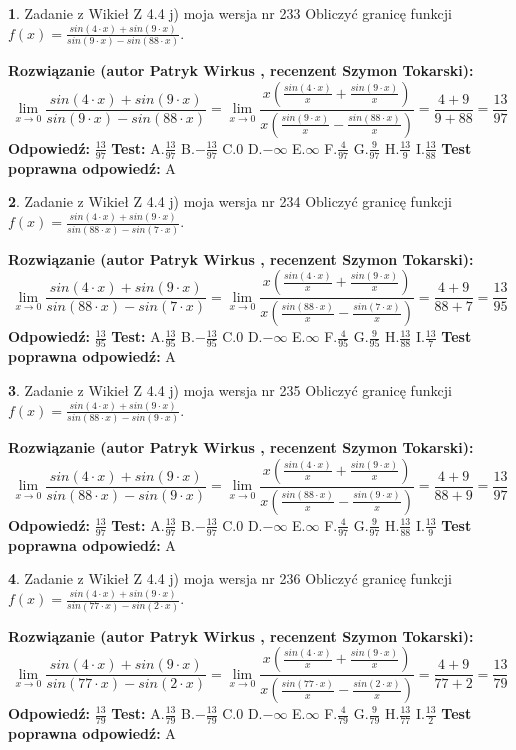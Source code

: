 \documentclass[12pt, a4paper]{article}
\theoremstyle{definition} %
\newtheorem{zad}{}
\newcommand{\zadStart}[1]{\begin{zad}#1\newline}
\newcommand{\zadStop}{\end{zad}}
\newcommand{\rozwStart}[2]{\noindent \textbf{Rozwiązanie (autor #1 , recenzent #2): }\newline}
\newcommand{\rozwStop}{\newline}
\newcommand{\odpStart}{\noindent \textbf{Odpowiedź:}\newline}
\newcommand{\odpStop}{\newline}
\newcommand{\testStart}{\noindent \textbf{Test:}\newline}
\newcommand{\testStop}{\newline}
\newcommand{\kluczStart}{\noindent \textbf{Test poprawna odpowiedź:}\newline}
\newcommand{\kluczStop}{\newline}
\begin{document}
\zadStart{Zadanie z Wikieł Z 4.4 j) moja wersja nr 233}
Obliczyć granicę funkcji $f(x)=\frac{sin(4\cdot x) +sin(9\cdot x)}{sin(9\cdot x) -sin(88\cdot x)}$.
\zadStop
\rozwStart{Patryk Wirkus}{Szymon Tokarski}
$$\lim\limits_{x\to 0}\frac{sin(4\cdot x) +sin(9\cdot x)}{sin(9\cdot x) -sin(88\cdot x)}=\lim\limits_{x\to 0}\frac{x(\frac{sin(4\cdot x)}{x}+\frac{sin(9\cdot x)}{x})}{x(\frac{sin(9\cdot x)}{x}-\frac{sin(88\cdot x)}{x})}=\frac{4+9}{9+88} = \frac{13}{97}$$
\rozwStop
\odpStart
$\frac{13}{97}$
\odpStop
\testStart
A.$\frac{13}{97}$
B.$-\frac{13}{97}$
C.$0$
D.$-\infty$
E.$\infty$
F.$\frac{4}{97}$
G.$\frac{9}{97}$
H.$\frac{13}{9}$
I.$\frac{13}{88}$
\testStop
\kluczStart
A
\kluczStop



\zadStart{Zadanie z Wikieł Z 4.4 j) moja wersja nr 234}
Obliczyć granicę funkcji $f(x)=\frac{sin(4\cdot x) +sin(9\cdot x)}{sin(88\cdot x) -sin(7\cdot x)}$.
\zadStop
\rozwStart{Patryk Wirkus}{Szymon Tokarski}
$$\lim\limits_{x\to 0}\frac{sin(4\cdot x) +sin(9\cdot x)}{sin(88\cdot x) -sin(7\cdot x)}=\lim\limits_{x\to 0}\frac{x(\frac{sin(4\cdot x)}{x}+\frac{sin(9\cdot x)}{x})}{x(\frac{sin(88\cdot x)}{x}-\frac{sin(7\cdot x)}{x})}=\frac{4+9}{88+7} = \frac{13}{95}$$
\rozwStop
\odpStart
$\frac{13}{95}$
\odpStop
\testStart
A.$\frac{13}{95}$
B.$-\frac{13}{95}$
C.$0$
D.$-\infty$
E.$\infty$
F.$\frac{4}{95}$
G.$\frac{9}{95}$
H.$\frac{13}{88}$
I.$\frac{13}{7}$
\testStop
\kluczStart
A
\kluczStop



\zadStart{Zadanie z Wikieł Z 4.4 j) moja wersja nr 235}
Obliczyć granicę funkcji $f(x)=\frac{sin(4\cdot x) +sin(9\cdot x)}{sin(88\cdot x) -sin(9\cdot x)}$.
\zadStop
\rozwStart{Patryk Wirkus}{Szymon Tokarski}
$$\lim\limits_{x\to 0}\frac{sin(4\cdot x) +sin(9\cdot x)}{sin(88\cdot x) -sin(9\cdot x)}=\lim\limits_{x\to 0}\frac{x(\frac{sin(4\cdot x)}{x}+\frac{sin(9\cdot x)}{x})}{x(\frac{sin(88\cdot x)}{x}-\frac{sin(9\cdot x)}{x})}=\frac{4+9}{88+9} = \frac{13}{97}$$
\rozwStop
\odpStart
$\frac{13}{97}$
\odpStop
\testStart
A.$\frac{13}{97}$
B.$-\frac{13}{97}$
C.$0$
D.$-\infty$
E.$\infty$
F.$\frac{4}{97}$
G.$\frac{9}{97}$
H.$\frac{13}{88}$
I.$\frac{13}{9}$
\testStop
\kluczStart
A
\kluczStop



\zadStart{Zadanie z Wikieł Z 4.4 j) moja wersja nr 236}
Obliczyć granicę funkcji $f(x)=\frac{sin(4\cdot x) +sin(9\cdot x)}{sin(77\cdot x) -sin(2\cdot x)}$.
\zadStop
\rozwStart{Patryk Wirkus}{Szymon Tokarski}
$$\lim\limits_{x\to 0}\frac{sin(4\cdot x) +sin(9\cdot x)}{sin(77\cdot x) -sin(2\cdot x)}=\lim\limits_{x\to 0}\frac{x(\frac{sin(4\cdot x)}{x}+\frac{sin(9\cdot x)}{x})}{x(\frac{sin(77\cdot x)}{x}-\frac{sin(2\cdot x)}{x})}=\frac{4+9}{77+2} = \frac{13}{79}$$
\rozwStop
\odpStart
$\frac{13}{79}$
\odpStop
\testStart
A.$\frac{13}{79}$
B.$-\frac{13}{79}$
C.$0$
D.$-\infty$
E.$\infty$
F.$\frac{4}{79}$
G.$\frac{9}{79}$
H.$\frac{13}{77}$
I.$\frac{13}{2}$
\testStop
\kluczStart
A
\kluczStop
\end{document}
